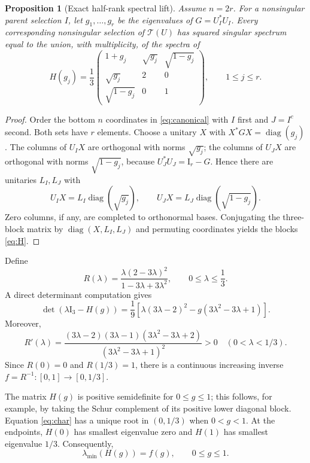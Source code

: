 \documentclass[11pt,letterpaper]{article}
\newtheorem{proposition}[theorem]{Proposition}
\theoremstyle{definition}
\theoremstyle{remark}
\newcommand{\Id}{\mathrm I}
\newcommand{\diag}{\operatorname{diag}}
\newcommand{\T}{\mathcal T}
\begin{document}
\begin{proposition}[Exact half-rank spectral lift]\label{prop:spectral}
Assume $n=2r$. For a nonsingular parent selection $I$, let $g_1,\ldots,g_r$ be the eigenvalues of $G=U_I^*U_I$. Every corresponding nonsingular selection of $\T(U)$ has squared singular spectrum equal to the union, with multiplicity, of the spectra of
\begin{equation}
 H(g_j)=\frac13\begin{pmatrix}
  1+g_j&\sqrt{g_j}&\sqrt{1-g_j}\\
  \sqrt{g_j}&2&0\\
  \sqrt{1-g_j}&0&1
 \end{pmatrix},\qquad 1\le j\le r.
 \label{eq:H}
\end{equation}
\end{proposition}
\begin{proof}
Order the bottom $n$ coordinates in \eqref{eq:canonical} with $I$ first and $J=I^c$ second. Both sets have $r$ elements. Choose a unitary $X$ with $X^*GX=\diag(g_j)$. The columns of $U_IX$ are orthogonal with norms $\sqrt{g_j}$; the columns of $U_JX$ are orthogonal with norms $\sqrt{1-g_j}$, because $U_J^*U_J=\Id_r-G$. Hence there are unitaries $L_I,L_J$ with
\[
 U_IX=L_I\diag(\sqrt{g_j}),\qquad
 U_JX=L_J\diag(\sqrt{1-g_j}).
\]
Zero columns, if any, are completed to orthonormal bases. Conjugating the three-block matrix by $\diag(X,L_I,L_J)$ and permuting coordinates yields the blocks \eqref{eq:H}.
\end{proof}

Define
\begin{equation}
 R(\lambda)=\frac{\lambda(2-3\lambda)^2}{1-3\lambda+3\lambda^2},
 \qquad 0\le\lambda\le\frac13.
 \label{eq:R}
\end{equation}
A direct determinant computation gives
\begin{equation}
 \det(\lambda\Id_3-H(g))
 =\frac19\left[\lambda(3\lambda-2)^2-g(3\lambda^2-3\lambda+1)\right].
 \label{eq:char}
\end{equation}
Moreover,
\begin{equation}
 R'(\lambda)=
 \frac{(3\lambda-2)(3\lambda-1)(3\lambda^2-3\lambda+2)}
 {(3\lambda^2-3\lambda+1)^2}>0
 \quad(0<\lambda<1/3).
 \label{eq:Rprime}
\end{equation}
Since $R(0)=0$ and $R(1/3)=1$, there is a continuous increasing inverse $f=R^{-1}:[0,1]\to[0,1/3]$.

The matrix $H(g)$ is positive semidefinite for $0\le g\le1$; this follows, for example, by taking the Schur complement of its positive lower diagonal block. Equation \eqref{eq:char} has a unique root in $(0,1/3)$ when $0<g<1$. At the endpoints, $H(0)$ has smallest eigenvalue zero and $H(1)$ has smallest eigenvalue $1/3$. Consequently,
\begin{equation}
 \lambda_{\min}(H(g))=f(g),\qquad 0\le g\le1.
 \label{eq:f}
\end{equation}
\end{document}
